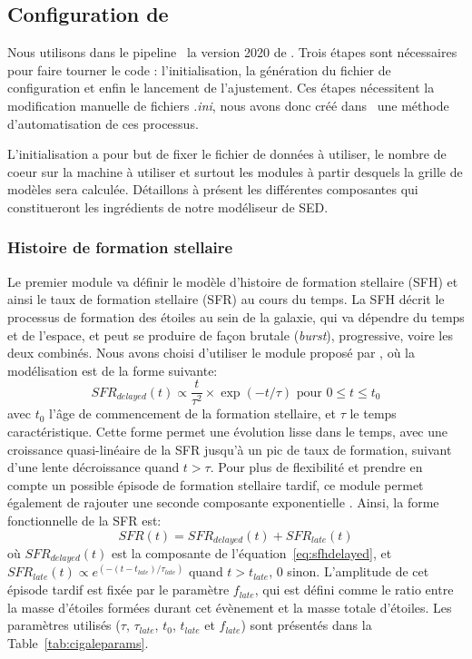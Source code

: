 \documentclass[../main/main.tex]{subfiles}
\begin{document}
\subsection{Configuration de }
\label{ssec:cigaleconfig}

Nous utilisons dans le pipeline \hypergal\ la version 2020 de
\cigale. Trois étapes sont nécessaires pour faire tourner le code :
l'initialisation, la génération du fichier de configuration et enfin le
lancement de l'ajustement. Ces étapes nécessitent la modification manuelle de
fichiers \textit{.ini}, nous avons donc créé dans \hypergal\ une méthode d'automatisation de ces processus.

L'initialisation a pour but de fixer le fichier de données à utiliser, le nombre de coeur sur la machine à
utiliser et surtout les modules à partir desquels la grille de modèles
sera calculée. Détaillons à présent les différentes composantes qui constitueront les ingrédients de notre modéliseur de SED.

\subsubsection{Histoire de formation stellaire}

Le premier module va définir le modèle d'histoire de formation stellaire
(SFH) et ainsi le taux de formation stellaire (SFR) au cours du
temps. La SFH décrit le processus de formation des étoiles au sein de la
galaxie, qui va dépendre du temps et de l'espace, et peut se produire de
façon brutale (\textit{burst}), progressive, voire les deux
combinés. Nous avons choisi d'utiliser le module
\textbf{} proposé par \cigale, où la modélisation est de la forme suivante:
\begin{equation}
  \label{eq:sfhdelayed}
  SFR_{delayed}(t)\propto \frac{t}{\tau^2}\times\exp(-t/\tau) \text{ pour $0\le t\le t_0$}
\end{equation}
avec $t_0$ l'âge de commencement de la formation stellaire, et $\tau$ le
temps caractéristique. Cette forme permet une évolution lisse dans le
temps, avec une croissance quasi-linéaire de la SFR jusqu'à un pic de
taux de formation, suivant d'une lente décroissance quand $t>\tau$.
Pour plus de flexibilité et prendre en compte un possible épisode de
formation stellaire tardif, ce module permet également de rajouter une
seconde composante exponentielle \citep{Malek2018}.
Ainsi, la forme fonctionnelle de la SFR est:
\begin{equation}
  \label{eq:sfhdelayedburst}
  SFR(t) = SFR_{delayed}(t) + SFR_{late}(t)
\end{equation}
où $SFR_{delayed}(t)$ est la composante de
l'équation~\ref{eq:sfhdelayed}, et $SFR_{late}(t)\propto
e^{(-(t-t_{late})/\tau_{late})}$ quand $t>t_{late}$, $0$
sinon. L'amplitude de cet épisode tardif est fixée par le paramètre
$f_{late}$, qui est défini comme le ratio entre la masse d'étoiles
formées durant cet évènement et la masse totale d'étoiles. Les
paramètres utilisés ($\tau$, $\tau_{late}$, $t_0$, $t_{late}$ et
$f_{late}$) sont présentés dans la Table~\ref{tab:cigaleparams}.
\end{document}
